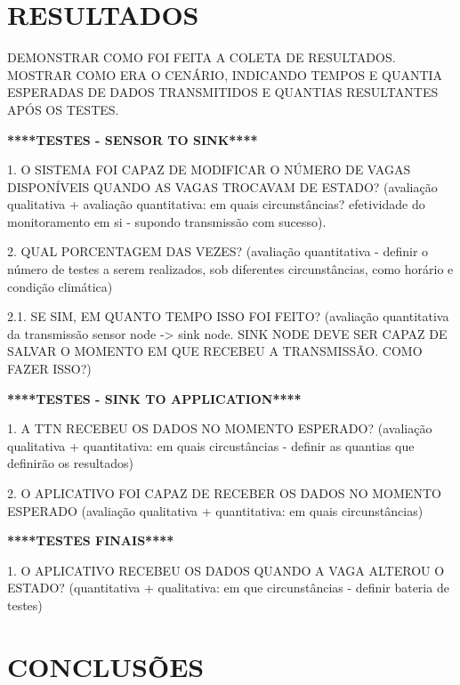 \documentclass[oneside,openright,12pt]{ufsm_2015} %
\begin{document}
\chapter{RESULTADOS}

DEMONSTRAR COMO FOI FEITA A COLETA DE RESULTADOS. MOSTRAR COMO ERA O CENÁRIO, INDICANDO TEMPOS E QUANTIA ESPERADAS DE DADOS TRANSMITIDOS E QUANTIAS RESULTANTES APÓS OS TESTES. 

\textbf{****TESTES - SENSOR TO SINK****}

1. O SISTEMA FOI CAPAZ DE MODIFICAR O NÚMERO DE VAGAS DISPONÍVEIS QUANDO AS VAGAS TROCAVAM DE ESTADO? (avaliação qualitativa + avaliação quantitativa: em quais circunstâncias?  efetividade do monitoramento em si - supondo transmissão com sucesso).

2. QUAL PORCENTAGEM DAS VEZES? (avaliação quantitativa - definir o número de testes a serem realizados, sob diferentes circunstâncias, como horário e condição climática)

2.1. SE SIM, EM QUANTO TEMPO ISSO FOI FEITO? (avaliação quantitativa da transmissão sensor node -> sink node. SINK NODE DEVE SER CAPAZ DE SALVAR O MOMENTO EM QUE RECEBEU A TRANSMISSÃO. COMO FAZER ISSO?)


\textbf{****TESTES - SINK TO APPLICATION****}

1. A TTN RECEBEU OS DADOS NO MOMENTO ESPERADO? (avaliação qualitativa + quantitativa: em quais circustâncias - definir as quantias que definirão os resultados)

2. O APLICATIVO FOI CAPAZ DE RECEBER OS DADOS NO MOMENTO ESPERADO (avaliação qualitativa + quantitativa: em quais circunstâncias)

\textbf{****TESTES FINAIS****}

1. O APLICATIVO RECEBEU OS DADOS QUANDO A VAGA ALTEROU O ESTADO? (quantitativa + qualitativa: em que circunstâncias - definir bateria de testes)


\chapter{CONCLUSÕES}
	 

        



\end{document}
